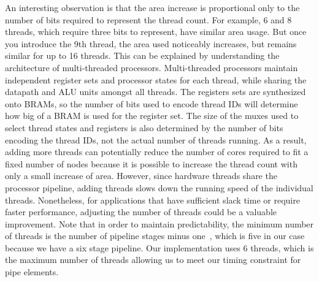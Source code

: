 An interesting observation is that the area increase is proportional only to the number of bits required to represent the thread count.  
For example, 6 and 8 threads, which require three bits to represent, have similar area usage.
But once you introduce the 9th thread, the area used noticeably increases, but remains similar for up to 16 threads. 
This can be explained by understanding the architecture of multi-threaded processors. 
Multi-threaded processors maintain independent register sets and processor states for each thread, while sharing the datapath and ALU units amongst all threads.
The registers sets are synthesized onto BRAMs, so the number of bits used to encode thread IDs will determine how big of a BRAM is used for the register set. 
The size of the muxes used to select thread states and registers is also determined by the number of bits encoding the thread IDs, not the actual number of threads running. 
As a result, adding more threads can potentially reduce the number of cores required to fit a fixed number of nodes because it is possible to increase the thread count with only a small increase of area.   
However, since hardware threads share the processor pipeline, adding threads slows down the running speed of the individual threads.
Nonetheless, for applications that have sufficient slack time or require faster performance, adjusting the number of threads could be a valuable improvement.
Note that in order to maintain predictability, the minimum number of threads is the number of pipeline stages minus one~\cite{pret_cases08}, which is five in our case because we have a six stage pipeline.
Our implementation uses 6 threads, which is the maximum number of threads allowing us to meet our timing constraint for pipe elements.


